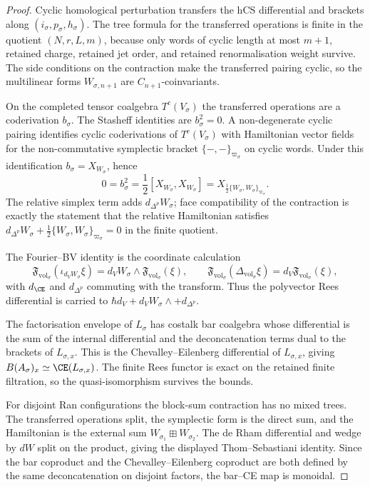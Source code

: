 \begin{proof}
Cyclic homological perturbation transfers the hCS differential and
brackets along $(i_\sigma,p_\sigma,h_\sigma)$. The tree formula for the
transferred operations is finite in the quotient $(N,r,L,m)$, because
only words of cyclic length at most $m+1$, retained charge, retained
jet order, and retained renormalisation weight survive. The side
conditions on the contraction make the transferred pairing cyclic, so
the multilinear forms $W_{\sigma,n+1}$ are $C_{n+1}$-coinvariants.

On the completed tensor coalgebra $T^c(V_\sigma)$ the transferred
operations are a coderivation $b_\sigma$. The Stasheff identities are
$b_\sigma^2=0$. A non-degenerate cyclic pairing identifies cyclic
coderivations of $T^c(V_\sigma)$ with Hamiltonian vector fields for the
non-commutative symplectic bracket
$\{-,-\}_{\varpi_\sigma}$ on cyclic words. Under this identification
$b_\sigma=X_{W_\sigma}$, hence
\[
 0=b_\sigma^2=\frac{1}{2}[X_{W_\sigma},X_{W_\sigma}]
 =X_{\frac{1}{2}\{W_\sigma,W_\sigma\}_{\varpi_\sigma}}.
\]
The relative simplex term adds $d_{\Delta^p}W_\sigma$; face
compatibility of the contraction is exactly the statement that the
relative Hamiltonian satisfies
$d_{\Delta^p}W_\sigma+\frac12\{W_\sigma,W_\sigma\}_{\varpi_\sigma}=0$
in the finite quotient.

The Fourier--BV identity is the coordinate calculation
\[
 \mathfrak F_{\mathrm{vol}_\sigma}(\iota_{d_VW_\sigma}\xi)
 =
 d_VW_\sigma\wedge\mathfrak F_{\mathrm{vol}_\sigma}(\xi),
 \qquad
 \mathfrak F_{\mathrm{vol}_\sigma}(\Delta_{\mathrm{vol}_\sigma}\xi)
 =
 d_V\mathfrak F_{\mathrm{vol}_\sigma}(\xi),
\]
with $d_{\CE}$ and $d_{\Delta^p}$ commuting with the transform. Thus
the polyvector Rees differential is carried to
$\hbar d_V+d_VW_\sigma\wedge+d_{\Delta^p}$.

The factorisation envelope of $L_\sigma$ has costalk bar coalgebra
whose differential is the sum of the internal differential and the
deconcatenation terms dual to the brackets of $L_{\sigma,x}$. This is
the Chevalley--Eilenberg differential of $L_{\sigma,x}$, giving
$B(A_\sigma)_x\simeq\CE(L_{\sigma,x})$. The finite Rees functor is
exact on the retained finite filtration, so the quasi-isomorphism
survives the bounds.

For disjoint Ran configurations the block-sum contraction has no mixed
trees. The transferred operations split, the symplectic form is the
direct sum, and the Hamiltonian is the external sum
$W_{\sigma_1}\boxplus W_{\sigma_2}$. The de Rham differential and
wedge by $dW$ split on the product, giving the displayed
Thom--Sebastiani identity. Since the bar coproduct and the
Chevalley--Eilenberg coproduct are both defined by the same
deconcatenation on disjoint factors, the bar--CE map is monoidal.
\end{proof}

